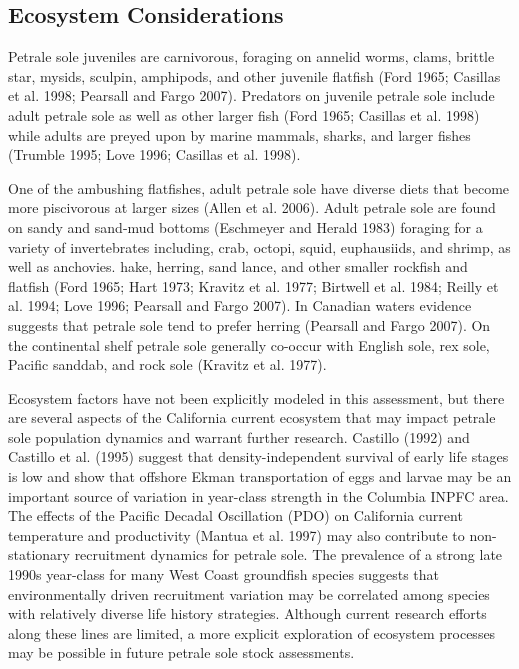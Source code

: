 \documentclass[12pt,]{article}
\begin{document}
\subsection{Ecosystem Considerations}\label{ecosystem-considerations-1}

Petrale sole juveniles are carnivorous, foraging on annelid worms,
clams, brittle star, mysids, sculpin, amphipods, and other juvenile
flatfish (Ford 1965; Casillas et al. 1998; Pearsall and Fargo 2007).
Predators on juvenile petrale sole include adult petrale sole as well as
other larger fish (Ford 1965; Casillas et al. 1998) while adults are
preyed upon by marine mammals, sharks, and larger fishes (Trumble 1995;
Love 1996; Casillas et al. 1998).

One of the ambushing flatfishes, adult petrale sole have diverse diets
that become more piscivorous at larger sizes (Allen et al. 2006). Adult
petrale sole are found on sandy and sand-mud bottoms (Eschmeyer and
Herald 1983) foraging for a variety of invertebrates including, crab,
octopi, squid, euphausiids, and shrimp, as well as anchovies. hake,
herring, sand lance, and other smaller rockfish and flatfish (Ford 1965;
Hart 1973; Kravitz et al. 1977; Birtwell et al. 1984; Reilly et al.
1994; Love 1996; Pearsall and Fargo 2007). In Canadian waters evidence
suggests that petrale sole tend to prefer herring (Pearsall and Fargo
2007). On the continental shelf petrale sole generally co-occur with
English sole, rex sole, Pacific sanddab, and rock sole (Kravitz et al.
1977).

Ecosystem factors have not been explicitly modeled in this assessment,
but there are several aspects of the California current ecosystem that
may impact petrale sole population dynamics and warrant further
research. Castillo (1992) and Castillo et al. (1995) suggest that
density-independent survival of early life stages is low and show that
offshore Ekman transportation of eggs and larvae may be an important
source of variation in year-class strength in the Columbia INPFC area.
The effects of the Pacific Decadal Oscillation (PDO) on California
current temperature and productivity (Mantua et al. 1997) may also
contribute to non-stationary recruitment dynamics for petrale sole. The
prevalence of a strong late 1990s year-class for many West Coast
groundfish species suggests that environmentally driven recruitment
variation may be correlated among species with relatively diverse life
history strategies. Although current research efforts along these lines
are limited, a more explicit exploration of ecosystem processes may be
possible in future petrale sole stock assessments.
\end{document}

